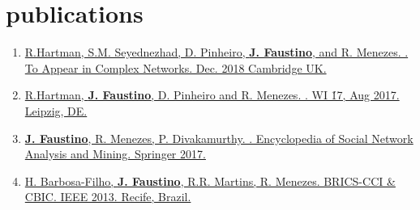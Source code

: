 \documentclass[]{cv-style}          %
\begin{document}
\section{publications}
  \vspace{-0.2cm}
 \begin{enumerate}
    \item \href{https://www.complexnetworks.org/program/}{R.Hartman, S.M. Seyednezhad, D. Pinheiro, \textbf{J. Faustino}, and R. Menezes. . To Appear in Complex Networks. Dec. 2018 Cambridge UK.}
    \item \href{https://doi.org/10.1145/3106426.3106493}{R.Hartman, \textbf{J. Faustino}, D. Pinheiro and R. Menezes. . WI \'17, Aug 2017. Leipzig, DE.}
     \item \href{http://dx.doi.org/10.1007/978-1-4614-7163-9_78-1}{\textbf{J. Faustino}, R. Menezes, P. Divakamurthy. .  Encyclopedia of Social Network Analysis and Mining. Springer 2017.} 
     \item \href{http://doi.computer.org/10.1109/BRICS-CCI-CBIC.2013.115}{ H. Barbosa-Filho, \textbf{J. Faustino}, R.R. Martins, R. Menezes.  BRICS-CCI \& CBIC. IEEE 2013. Recife, Brazil.}
 \end{enumerate}
\end{document}
